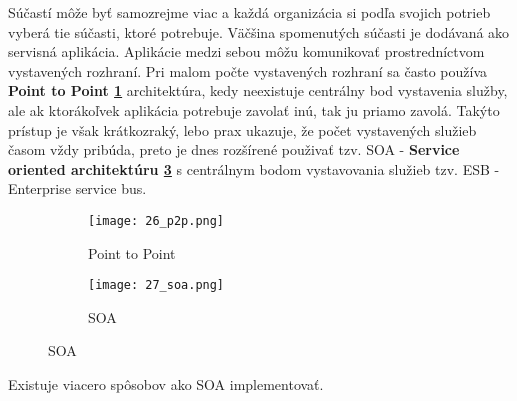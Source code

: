 Súčastí môže byť samozrejme viac a každá organizácia si podľa svojich potrieb vyberá tie  súčasti, ktoré potrebuje. Väčšina spomenutých súčasti je dodávaná ako servisná aplikácia. Aplikácie medzi sebou môžu komunikovať prostredníctvom vystavených rozhraní. Pri malom počte vystavených rozhraní sa často používa \textbf{Point to Point \ref{26_p2p}} architektúra, kedy neexistuje centrálny bod vystavenia služby, ale ak ktorákoľvek aplikácia potrebuje zavolať inú, tak ju priamo zavolá. Takýto prístup je však krátkozraký, lebo prax ukazuje, že počet vystavených služieb časom vždy pribúda, preto je dnes rozšírené použivať tzv. SOA - \textbf{Service oriented architektúru \ref{27_soa}} s centrálnym bodom vystavovania služieb tzv. ESB - Enterprise service bus.
\begin{figure}[h]
\centering
\begin{subfigure}{0.5\linewidth}
\texttt{[image: 26\_p2p.png]}
\caption{Point to Point \cite{IOT13}}
\label{26_p2p}
\end{subfigure}%
\begin{subfigure}{0.5\linewidth}
\texttt{[image: 27\_soa.png]}
\caption{SOA \cite{IOT13}}
\label{27_soa}
\end{subfigure}
\end{figure}
Existuje viacero spôsobov ako SOA implementovať. 
